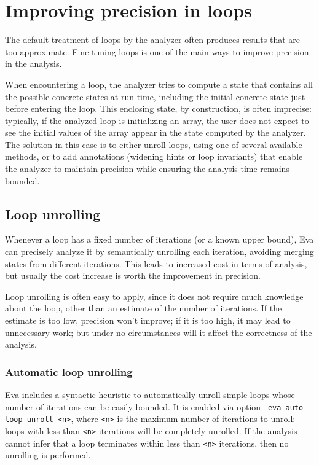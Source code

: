 \documentclass[web]{frama-c-book}
\newcommand{\Eva}{\textsf{Eva}}
\begin{document}
\section{Improving precision in loops}
\label{boucles-traitement}

The default treatment of loops by the analyzer often produces
results that are too approximate.
Fine-tuning loops is one of the main ways to improve precision in the analysis.

When encountering a loop, the analyzer tries to compute a state
that contains all the possible concrete states at run-time,
including the initial concrete state just before entering the loop.
This enclosing state, by construction, is often imprecise:
typically, if the analyzed loop is initializing an array,
the user does not expect to see the initial values of
the array appear in the state computed by the analyzer.
The solution in this case is to either unroll loops, using one of several
available methods, or to add annotations (widening hints or loop invariants)
that enable the analyzer to maintain precision while ensuring the analysis
time remains bounded.

\subsection{Loop unrolling}
\label{loop-unroll}

Whenever a loop has a fixed number of iterations (or a known upper bound),
Eva can precisely analyze it by semantically unrolling each iteration,
avoiding merging states from different iterations.
This leads to increased cost in terms of analysis, but usually the cost
increase is worth the improvement in precision.

Loop unrolling is often easy to apply, since it does not require much
knowledge about the loop, other than an estimate of the number of iterations.
If the estimate is too low, precision won't improve; if it is too high,
it may lead to unnecessary work; but under no circumstances will it affect the
correctness of the analysis.

\subsubsection{Automatic loop unrolling}

\Eva{} includes a syntactic heuristic to automatically unroll simple loops
whose number of iterations can be easily bounded.
It is enabled via option \lstinline|-eva-auto-loop-unroll <n>|, where
\lstinline|<n>| is the maximum number of iterations to unroll: loops with
less than \lstinline|<n>| iterations will be completely unrolled.
If the analysis cannot infer that a loop terminates within less than
\lstinline|<n>| iterations, then no unrolling is performed.
\end{document}
